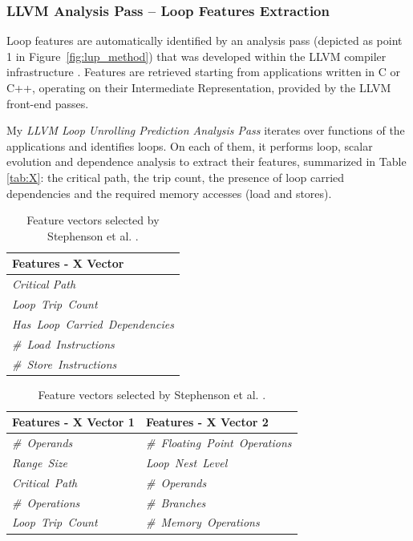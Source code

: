 \documentclass[]{usiinfthesis}
\begin{document}
\subsubsection{LLVM Analysis Pass -- Loop Features Extraction}

Loop features are automatically identified by an analysis pass (depicted as 
point 1 in Figure~\ref{fig:lup_method}) that was developed within the LLVM 
compiler infrastructure \cite{LattnerMar04}. Features are retrieved starting from
applications written in C or C++, operating on their Intermediate
Representation, provided by the LLVM front-end passes.\par  

My \textit{LLVM Loop Unrolling Prediction Analysis Pass} iterates over functions
of the applications and identifies loops. On each of them, it performs
loop, scalar evolution and dependence analysis to extract their
features, summarized in Table \ref{tab:X}: the critical path, the trip
count, the presence of loop carried dependencies and the required
memory accesses (load and stores).\par

%
%
\begin{table}[h]
  \centering

  \small\addtolength{\tabcolsep}{-3pt}
  \vspace{1em}
  \begin{tabular}{| l |} 
 \hline    
 \textbf{Features - X Vector}  \\ \hline
    \emph{Critical Path}      \\ \hline
   \emph{ Loop\ Trip\ Count} \\ \hline
   \emph{ Has\ Loop\ Carried\ Dependencies}     \\ \hline
   \emph{ \#\ Load\ Instructions}     \\ \hline
   \emph{ \#\ Store\ Instructions}      \\ \hline
  \end{tabular} 
    \caption{Features extracted by LLVM LU Analysis Pass.}
      \label{tab:X}
  
  
     \vspace{2em}
  

  \begin{tabular}{| l | l |} 
 \hline    
 \textbf{Features - X Vector 1} & \textbf{Features - X Vector 2}  \\ \hline
  \emph{\#\ Operands}        &\emph{\#\ Floating\ Point\ Operations}        \\ \hline
  \emph{Range\ Size}     &\emph{Loop\ Nest\ Level}   \\ \hline
    \emph{Critical\ Path}   &\emph{\#\ Operands}  \\ \hline
  \emph{\#\ Operations}      &\emph{\#\ Branches}   \\ \hline
  \emph{Loop\ Trip\ Count}&\emph{\#\ Memory\ Operations}   \\ \hline
  \end{tabular}
    \caption{Feature vectors selected by Stephenson et al. \cite{StephensonApr05}.}
      \label{tab:St_X1_X2}
\end{table}
\end{document}
